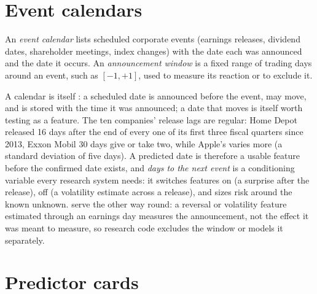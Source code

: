 \section{Event calendars}

\begin{definition}\label{def:rs:fundamental-analyst-and-event-features:calendar}
An \emph{event calendar} lists scheduled corporate events (earnings releases, dividend dates, shareholder meetings,
index changes) with the date each was announced and the date it occurs. An \emph{announcement window} is a fixed
range of trading days around an event, such as $[-1, +1]$, used to measure its reaction or to exclude it.
\end{definition}

A calendar is itself : a scheduled date is announced before the event, may move, and is stored with the time it
was announced; a date that moves is itself worth testing as a feature. The ten companies' release lags are regular: Home Depot released
16 days after the end of every one of its first three fiscal quarters since 2013, Exxon Mobil 30 days give or take two, while Apple's varies more (a standard deviation of five days). A predicted date is therefore a usable feature before the
confirmed date exists, and \emph{days to the next event} is a conditioning variable every research system needs: it
switches features on (a surprise after the release), off (a volatility estimate across a release), and sizes risk around the known unknown.
 serve the other way round: a reversal or volatility feature estimated through an earnings day measures the announcement,
not the effect it was meant to measure, so research code excludes the window or models it separately.

\section{Predictor cards}

